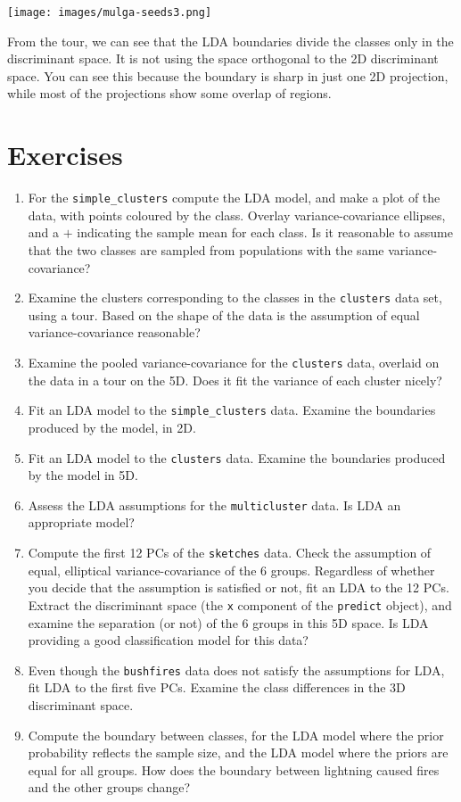 \documentclass[
  letterpaper,
]{krantz}
\providecommand{\tightlist}{%
  \setlength{\itemsep}{0pt}\setlength{\parskip}{0pt}}\usepackage{longtable,booktabs,array}
\newcommand{\insightbox}[1]{%
\noindent\colorbox{insight!30}{%
\begin{minipage}{0.98\textwidth}%
    \centering%
    \begin{minipage}[c]{0.15\textwidth} %
      \texttt{[image: images/mulga-seeds3.png]} %
    \end{minipage}%
    \hfill %
    \begin{minipage}[c]{0.8\textwidth} %
      \bigskip%
      \textsf{#1}%
      \bigskip%
    \end{minipage}%
    \hspace*{3mm}%
  \end{minipage}%
}%
}
\begin{document}
\insightbox{From the tour, we can see that the LDA boundaries divide the classes only in the discriminant space. It is not using the space orthogonal to the 2D discriminant space. You can see this because the boundary is sharp in just one 2D projection, while most of the projections show some overlap of regions.}

\section*{Exercises}\label{exercises-13}


\begin{enumerate}
\def\labelenumi{\arabic{enumi}.}
\tightlist
\item
  For the \texttt{simple\_clusters} compute the LDA model, and make a
  plot of the data, with points coloured by the class. Overlay
  variance-covariance ellipses, and a \(+\) indicating the sample mean
  for each class. Is it reasonable to assume that the two classes are
  sampled from populations with the same variance-covariance?
\item
  Examine the clusters corresponding to the classes in the
  \texttt{clusters} data set, using a tour. Based on the shape of the
  data is the assumption of equal variance-covariance reasonable?
\item
  Examine the pooled variance-covariance for the \texttt{clusters} data,
  overlaid on the data in a tour on the 5D. Does it fit the variance of
  each cluster nicely?
\item
  Fit an LDA model to the \texttt{simple\_clusters} data. Examine the
  boundaries produced by the model, in 2D.
\item
  Fit an LDA model to the \texttt{clusters} data. Examine the boundaries
  produced by the model in 5D.
\item
  Assess the LDA assumptions for the \texttt{multicluster} data. Is LDA
  an appropriate model?
\item
  Compute the first 12 PCs of the \texttt{sketches} data. Check the
  assumption of equal, elliptical variance-covariance of the 6 groups.
  Regardless of whether you decide that the assumption is satisfied or
  not, fit an LDA to the 12 PCs. Extract the discriminant space (the
  \texttt{x} component of the \texttt{predict} object), and examine the
  separation (or not) of the 6 groups in this 5D space. Is LDA providing
  a good classification model for this data?
\item
  Even though the \texttt{bushfires} data does not satisfy the
  assumptions for LDA, fit LDA to the first five PCs. Examine the class
  differences in the 3D discriminant space.
\item
  Compute the boundary between classes, for the LDA model where the
  prior probability reflects the sample size, and the LDA model where
  the priors are equal for all groups. How does the boundary between
  lightning caused fires and the other groups change?
\end{enumerate}
\end{document}
